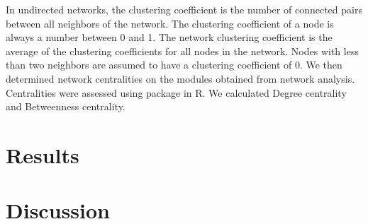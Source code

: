 \documentclass[a4paper]{article}
\begin{document}
In undirected networks, the clustering coefficient is the number of connected pairs between all neighbors of the network. The clustering coefficient of a node is always a number between 0 and 1. The network clustering coefficient is the average of the clustering coefficients for all nodes in the network. Nodes with less than two neighbors are assumed to have a clustering coefficient of 0. We then determined network centralities on the modules obtained from network analysis. Centralities were assessed using package in R. We calculated Degree centrality and Betweenness centrality.


\section*{Results}

\section*{Discussion}


\end{document}
